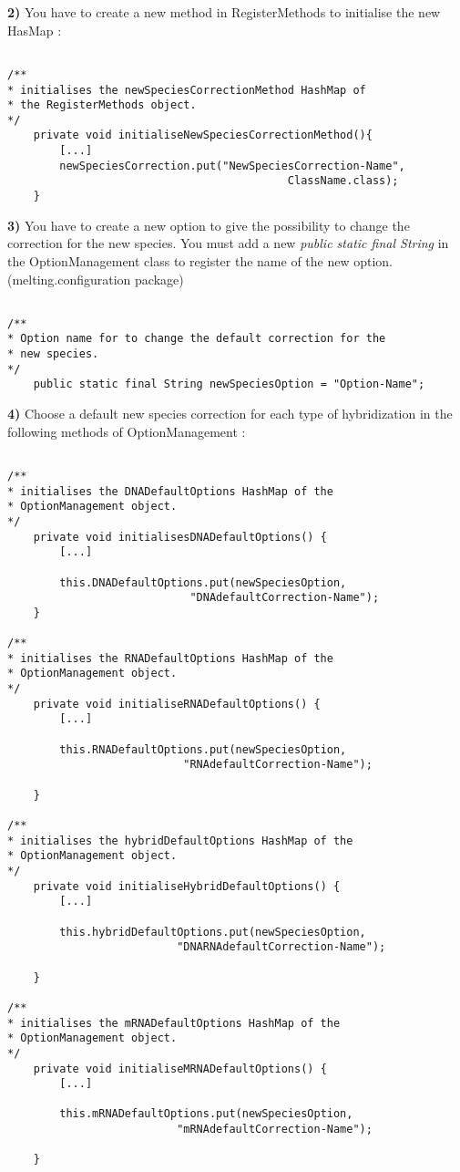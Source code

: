 \documentclass{article}
\begin{document}
\textbf{2)} You have to create a new method in RegisterMethods to initialise the new HasMap :

\begin{verbatim}

/**
* initialises the newSpeciesCorrectionMethod HashMap of 
* the RegisterMethods object.
*/
	private void initialiseNewSpeciesCorrectionMethod(){
		[...]
		newSpeciesCorrection.put("NewSpeciesCorrection-Name", 
		                                   ClassName.class);
	}

\end{verbatim}


\textbf{3)} You have to create a new option to give the possibility to change the correction
for the new species. You must add a new \textit{public static final String} in the 
OptionManagement class to register the name of the new option. (melting.configuration package)

\begin{verbatim}

/**
* Option name for to change the default correction for the 
* new species.
*/
	public static final String newSpeciesOption = "Option-Name";

\end{verbatim}

\textbf{4)} Choose a default new species correction for each type of hybridization in
the following methods of OptionManagement :

\begin{verbatim}

/**
* initialises the DNADefaultOptions HashMap of the 
* OptionManagement object.
*/
	private void initialisesDNADefaultOptions() {
		[...]
		
		this.DNADefaultOptions.put(newSpeciesOption, 
		                    "DNAdefaultCorrection-Name");
	}
	
/**
* initialises the RNADefaultOptions HashMap of the 
* OptionManagement object.
*/
	private void initialiseRNADefaultOptions() {
		[...]
		
		this.RNADefaultOptions.put(newSpeciesOption, 
		                   "RNAdefaultCorrection-Name");

	}
	
/**
* initialises the hybridDefaultOptions HashMap of the 
* OptionManagement object.
*/
	private void initialiseHybridDefaultOptions() {
		[...]
		
		this.hybridDefaultOptions.put(newSpeciesOption, 
		                  "DNARNAdefaultCorrection-Name");
		
	}
	
/**
* initialises the mRNADefaultOptions HashMap of the 
* OptionManagement object.
*/
	private void initialiseMRNADefaultOptions() {
		[...]
		
		this.mRNADefaultOptions.put(newSpeciesOption, 
		                  "mRNAdefaultCorrection-Name");

	}
	
\end{verbatim}
\end{document}
